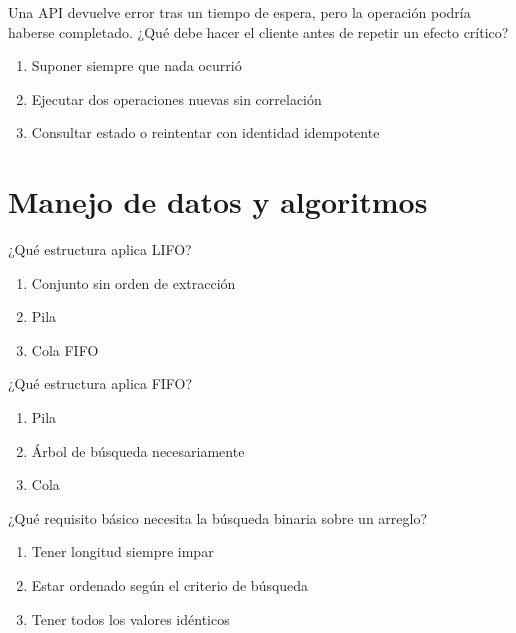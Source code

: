 \noindent\begin{minipage}{\linewidth}\setlength{\parskip}{4pt}\label{q:S-058}
Una API devuelve error tras un tiempo de espera, pero la operación podría haberse completado. ¿Qué debe hacer el cliente antes de repetir un efecto crítico?
\begin{enumerate}[label=\Alph*),nosep]
\item Suponer siempre que nada ocurrió
\item Ejecutar dos operaciones nuevas sin correlación
\item Consultar estado o reintentar con identidad idempotente
\end{enumerate}\end{minipage}\par\medskip

\section{Manejo de datos y algoritmos}

\noindent\begin{minipage}{\linewidth}\setlength{\parskip}{4pt}\label{q:S-059}
¿Qué estructura aplica LIFO?
\begin{enumerate}[label=\Alph*),nosep]
\item Conjunto sin orden de extracción
\item Pila
\item Cola FIFO
\end{enumerate}\end{minipage}\par\medskip

\noindent\begin{minipage}{\linewidth}\setlength{\parskip}{4pt}\label{q:S-060}
¿Qué estructura aplica FIFO?
\begin{enumerate}[label=\Alph*),nosep]
\item Pila
\item Árbol de búsqueda necesariamente
\item Cola
\end{enumerate}\end{minipage}\par\medskip

\noindent\begin{minipage}{\linewidth}\setlength{\parskip}{4pt}\label{q:S-061}
¿Qué requisito básico necesita la búsqueda binaria sobre un arreglo?
\begin{enumerate}[label=\Alph*),nosep]
\item Tener longitud siempre impar
\item Estar ordenado según el criterio de búsqueda
\item Tener todos los valores idénticos
\end{enumerate}\end{minipage}\par\medskip

